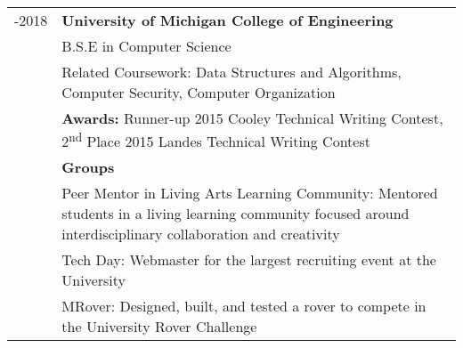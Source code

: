 %
%
%
\newcommand{\nextitem}{\par\hspace*{\labelsep}\faAngleRight\hspace*{\labelsep}}

\begin{tabular}{>{\small}r>{\small}p{14cm}}
 \parbox{\datebox}{-2018} & \textbf{University of Michigan College of Engineering} \\
 & B.S.E in Computer Science \\
 & Related Coursework: Data Structures and Algorithms, Computer Security, Computer Organization\\
 & \textbf{Awards:} Runner-up 2015 Cooley Technical Writing Contest, 2\textsuperscript{nd} Place 2015 Landes Technical Writing Contest\\
 & \textbf{Groups} \\
 & \nextitem Peer Mentor in Living Arts Learning Community: Mentored students in a living learning community focused around interdisciplinary collaboration and creativity \\
 & \nextitem Tech Day: Webmaster for the largest recruiting event at the University \\
 & \nextitem MRover: Designed, built, and tested a rover to compete in the University Rover Challenge\\
\end{tabular}